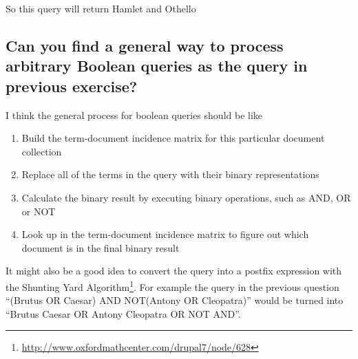 \documentclass[11pt]{article} %
\begin{document}
So this query will return Hamlet and Othello

\subsection{Can you find a general way to process arbitrary Boolean queries as the query in previous exercise?}

I think the general process for boolean queries should be like

\begin{enumerate}
    \item Build the term-document incidence matrix for this particular document collection
    \item Replace all of the terms in the query with their binary representations
    \item Calculate the binary result by executing binary operations, such as AND, OR or NOT
    \item Look up in the term-document incidence matrix to figure out which document is in the final binary result
\end{enumerate}

It might also be a good idea to convert the query into a postfix expression with the Shunting Yard Algorithm\footnote{\url{http://www.oxfordmathcenter.com/drupal7/node/628}}. For example the query in the previous question ``(Brutus OR Caesar) AND NOT(Antony OR Cleopatra)'' would be turned into ``Brutus Caesar OR Antony Cleopatra OR NOT AND''.
\end{document}
